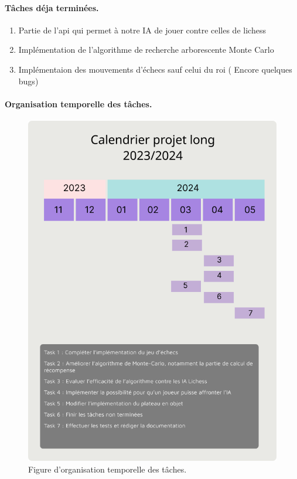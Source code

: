 \documentclass{article}
\begin{document}
\paragraph{Tâches déja terminées.}
\begin{enumerate}

  \item Partie de l'api qui permet à notre IA de jouer contre celles de lichess
  \item Implémentation de l'algorithme de recherche arborescente Monte Carlo
  \item Implémentaion des mouvements d'échecs sauf celui du roi ( Encore quelques bugs)
\end{enumerate}

\paragraph{Organisation temporelle des tâches.}

\begin{figure}[ht]
  \centering
  \includegraphics[width=0.8\linewidth]{Schedule.png}
  \caption{Figure d'organisation temporelle des tâches.}
  \label{fig:Schedule}
\end{figure}
\end{document}
